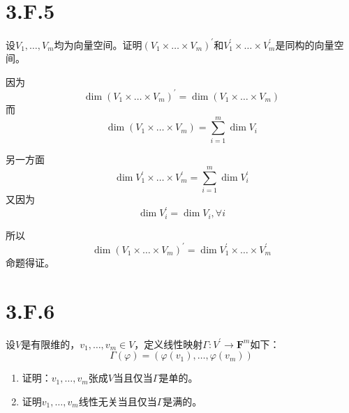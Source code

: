 \documentclass[10pt,a4paper,UTF8]{article}
\begin{document}
\section{3.F.5}
\label{sec:orgf360eec}


\begin{problem}
设\(V_{1},\ldots ,V_{m}\)均为向量空间。证明\((V_{1}\times \ldots \times V_{m})^{'}\)和\(V_{1}^{'}\times \ldots \times V_{m}^{'}\)是同构的向量空间。
\end{problem}

\begin{answer}
因为\[\dim (V_{1}\times \ldots \times V_{m})^{'} = \dim (V_{1}\times \ldots \times V_{m})\]而\[ \dim (V_{1}\times \ldots \times V_{m}) = \sum_{i=1}^{m}\dim V_{i}\]

另一方面\[\dim V_{1}^{'}\times \ldots \times V_{m}^{'} = \sum_{i=1}^{m}\dim V_{i}^{'}\] 又因为\[\dim V_{i}^{'} = \dim V_{i},\forall i\]

所以\[\dim (V_{1}\times \ldots \times V_{m})^{'} = \dim V_{1}^{'}\times \ldots \times V_{m}^{'}\]命题得证。
\end{answer}

\section{3.F.6}
\label{sec:org8bcec9f}


\begin{problem}
设\(V\)是有限维的，\(v_{1},\ldots ,v_{m}\in V\)，定义线性映射\(\Gamma:V^{'}\rightarrow \mathbf{F}^{m}\)如下：\[\Gamma(\varphi) = (\varphi(v_{1}), \ldots ,\varphi(v_{m}))\]
\begin{enumerate}
\item 证明：\(v_{1},\ldots ,v_{m}\)张成\(V\)当且仅当\(\Gamma\)是单的。
\item 证明\(v_{1},\ldots ,v_{m}\)线性无关当且仅当\(\Gamma\)是满的。
\end{enumerate}
\end{problem}
\end{document}
